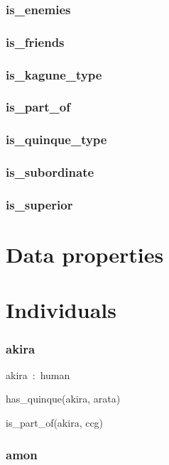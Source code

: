 \documentclass{article}
\begin{document}
\subsubsection*{is\_enemies}

\subsubsection*{is\_friends}

\subsubsection*{is\_kagune\_type}

\subsubsection*{is\_part\_of}

\subsubsection*{is\_quinque\_type}

\subsubsection*{is\_subordinate}

\subsubsection*{is\_superior}

\section*{Data properties}\section*{Individuals}\subsubsection*{akira}

akira~:~human

has\_quinque(akira, arata)

is\_part\_of(akira, ccg)

\subsubsection*{amon}
\end{document}

